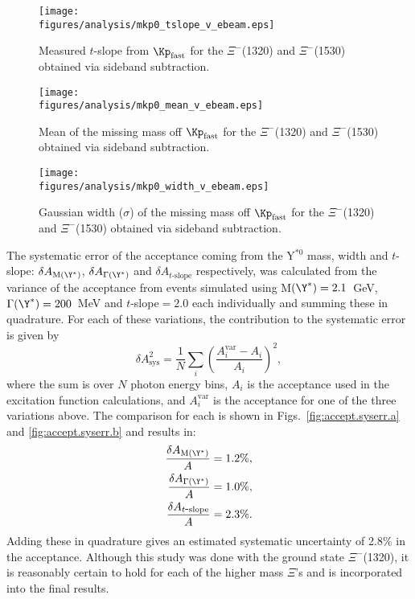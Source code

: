 \begin{figure}[bhp]\centering
    \texttt{[image: \\figures/analysis/mkp0\_tslope\_v\_ebeam.eps]}
    \caption[$\Kp_\mathrm{fast}$ $t$-slope]{\label{fig:measured.tslope}Measured $t$-slope from $\Kp_\mathrm{fast}$ for the $\Xi^-$(1320) and $\Xi^-$(1530) obtained via sideband subtraction.}
\end{figure}

\begin{figure}[tbhp]\centering
    \texttt{[image: \\figures/analysis/mkp0\_mean\_v\_ebeam.eps]}
    \caption[MM($\Kp_\mathrm{fast}$) mean]{\label{fig:mkp0.mean}Mean of the missing mass off $\Kp_\mathrm{fast}$ for the $\Xi^-$(1320) and $\Xi^-$(1530) obtained via sideband subtraction.}
\end{figure}

\begin{figure}[tbhp]\centering
    \texttt{[image: \\figures/analysis/mkp0\_width\_v\_ebeam.eps]}
    \caption[MM($\Kp_\mathrm{fast}$) width]{\label{fig:mkp0.width}Gaussian width ($\sigma$) of the missing mass off $\Kp_\mathrm{fast}$ for the $\Xi^-$(1320) and $\Xi^-$(1530) obtained via sideband subtraction.}
\end{figure}


The systematic error of the acceptance coming from the Y$^{*0}$ mass, width and $t$-slope: $\delta A_{\mathrm{M}(\Y^*)}$, $\delta A_{\Gamma(\Y^*)}$ and $\delta A_{t\mbox{-}\mathrm{slope}}$ respectively, was calculated from the variance of the acceptance from events simulated using M$(\Y^*)=2.1$~GeV, $\Gamma(\Y^*) = 200$~MeV and $t$-slope$ = 2.0$ each individually and summing these in quadrature. For each of these variations, the contribution to the systematic error is given by
\begin{equation}
    \delta A^2_\mathrm{sys} = \frac{1}{N}
    \sum_i \left(
        \frac{A^\mathrm{var}_i - A_i}{A_i}
        \right)^2,
\end{equation}
where the sum is over $N$ photon energy bins, $A_i$ is the acceptance used in the excitation function calculations, and $A^\mathrm{var}_i$ is the acceptance for one of the three variations above. The comparison for each is shown in Figs.~\ref{fig:accept.syserr.a} and \ref{fig:accept.syserr.b} and results in:
\begin{align}
    \frac{\delta A_{\mathrm{M}(\Y^*)}}{A} & = 1.2 \%, \nonumber \\
    \frac{\delta A_{\Gamma(\Y^*)}}{A} & = 1.0 \%, \nonumber \\
    \frac{\delta A_{t\mbox{-}\mathrm{slope}}}{A} & = 2.3 \%.
\end{align}
Adding these in quadrature gives an estimated systematic uncertainty of 2.8\% in the acceptance. Although this study was done with the ground state $\Xi^-$(1320), it is reasonably certain to hold for each of the higher mass $\Xi$'s and is incorporated into the final results.

